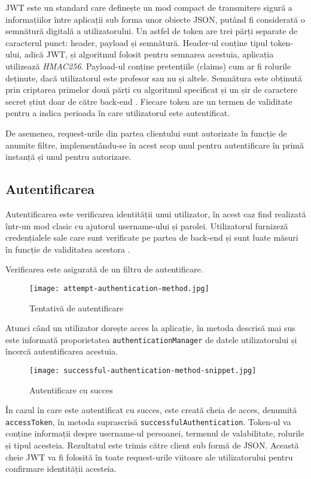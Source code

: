 JWT este un standard care definește un mod compact de transmitere sigură a informațiilor între aplicații sub forma unor obiecte JSON, putând fi considerată o semnătură digitală a utilizatorului. Un astfel de token are trei părți separate de caracterul punct: header, payload și semnătură. Header-ul conține tipul token-ului, adică JWT, și algoritmul folosit pentru semnarea acestuia, aplicația \thesistitle{} utilizează \textit{HMAC256}. Payload-ul conține pretențiile (claims) cum ar fi rolurile deținute, dacă utilizatorul este profesor sau nu și altele. Semnătura este obținută prin criptarea primelor două părți cu algoritmul specificat și un șir de caractere secret știut doar de către back-end \cite{jwt}. Fiecare token are un termen de validitate pentru a indica perioada în care utilizatorul este autentificat.

De asemenea, request-urile din partea clientului sunt autorizate în funcție de anumite filtre, implementându-se în acest scop unul pentru autentificare în primă instanță și unul pentru autorizare.

\subsection{Autentificarea}

Autentificarea este verificarea identității unui utilizator, în acest caz find realizată într-un mod clasic cu ajutorul username-ului și parolei. Utilizatorul furnizeză credențialele sale care sunt verificate pe partea de back-end și sunt luate măsuri în funcție de validitatea acestora \cite{spring-security}.

Verificarea este asigurată de un filtru de autentificare.

\begin{figure}[H]
	\centering
	\texttt{[image: attempt-authentication-method.jpg]}
	\caption{Tentativă de autentificare}
\end{figure}

Atunci când un utilizator dorește acces la aplicație, în metoda descrisă mai sus este informată proporietatea \texttt{authenticationManager} de datele utilizatorului și încercă autentificarea acestuia.

\begin{figure}[H]
	\centering
	\texttt{[image: successful-authentication-method-snippet.jpg]}
	\caption{Autentificare cu succes}
\end{figure}

În cazul în care este autentificat cu succes, este creată cheia de acces, denumită \texttt{accessToken}, în metoda suprascrisă \texttt{successfulAuthentication}. Token-ul va conține informații despre username-ul persoanei, termenul de valabilitate, rolurile și tipul acesteia. Rezultatul este trimis către client sub formă de JSON. Această cheie JWT va fi folosită în toate request-urile viitoare ale utilizatorului pentru confirmare identității acesteia.

